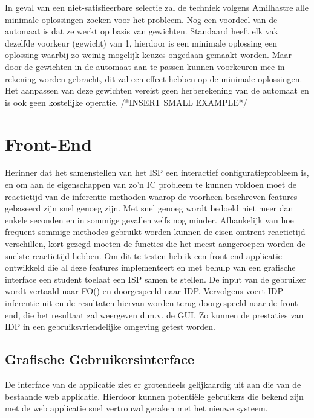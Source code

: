 In geval van een niet-satisfieerbare selectie zal de techniek volgens Amilhastre alle minimale oplossingen zoeken voor het probleem. Nog een voordeel van de automaat is dat ze werkt op basis van gewichten. Standaard heeft elk vak dezelfde voorkeur (gewicht) van 1, hierdoor is een minimale oplossing een oplossing waarbij zo weinig mogelijk keuzes ongedaan gemaakt worden. Maar door de gewichten in de automaat aan te passen kunnen voorkeuren mee in rekening worden gebracht, dit zal een effect hebben op de minimale oplossingen. Het aanpassen van deze gewichten vereist geen herberekening van de automaat en is ook geen kostelijke operatie. /*INSERT SMALL EXAMPLE*/

\section{Front-End}
Herinner dat het samenstellen van het ISP een interactief configuratieprobleem is, en om aan de eigenschappen van zo'n IC probleem te kunnen voldoen moet de reactietijd van de inferentie methoden waarop de voorheen beschreven features gebaseerd zijn snel genoeg zijn. Met snel genoeg wordt bedoeld niet meer dan enkele seconden en in sommige gevallen zelfs nog minder. Afhankelijk van hoe frequent sommige methodes gebruikt worden kunnen de eisen omtrent reactietijd verschillen, kort gezegd moeten de functies die het meest aangeroepen worden de snelste reactietijd hebben. Om dit te testen heb ik een front-end applicatie ontwikkeld die al deze features implementeert en met behulp van een grafische interface een student toelaat een ISP samen te stellen. De input van de gebruiker wordt vertaald naar FO(\textperiodcentered) en doorgespeeld naar IDP. Vervolgens voert IDP inferentie uit en de resultaten hiervan worden terug doorgespeeld naar de front-end, die het resultaat zal weergeven d.m.v. de GUI. Zo kunnen de prestaties van IDP in een gebruiksvriendelijke omgeving getest worden. 

\subsection{Grafische Gebruikersinterface}
De interface van de applicatie ziet er grotendeels gelijkaardig uit aan die van de bestaande web applicatie. Hierdoor kunnen potenti\"{e}le gebruikers die bekend zijn met de web applicatie snel vertrouwd geraken met het nieuwe systeem. 

